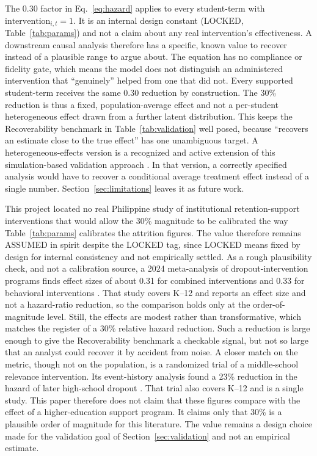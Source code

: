 \documentclass[11pt]{article}
\begin{document}
The $0.30$ factor in Eq.~\ref{eq:hazard} applies to every student-term with $\text{intervention}_{i,t}=1$. It is an internal design constant (LOCKED, Table~\ref{tab:params}) and not a claim about any real intervention's effectiveness. A downstream causal analysis therefore has a specific, known value to recover instead of a plausible range to argue about. The equation has no compliance or fidelity gate, which means the model does not distinguish an administered intervention that ``genuinely'' helped from one that did not. Every supported student-term receives the same $0.30$ reduction by construction. The 30\% reduction is thus a fixed, population-average effect and not a per-student heterogeneous effect drawn from a further latent distribution. This keeps the Recoverability benchmark in Table~\ref{tab:validation} well posed, because ``recovers an estimate close to the true effect'' has one unambiguous target. A heterogeneous-effects version is a recognized and active extension of this simulation-based validation approach \citep{smith2020global}. In that version, a correctly specified analysis would have to recover a conditional average treatment effect instead of a single number. Section~\ref{sec:limitations} leaves it as future work.

This project located no real Philippine study of institutional retention-support interventions that would allow the 30\% magnitude to be calibrated the way Table~\ref{tab:params} calibrates the attrition figures. The value therefore remains ASSUMED in spirit despite the LOCKED tag, since LOCKED means fixed by design for internal consistency and not empirically settled. As a rough plausibility check, and not a calibration source, a 2024 meta-analysis of dropout-intervention programs finds effect sizes of about 0.31 for combined interventions and 0.33 for behavioral interventions \citep{wang2024meta}. That study covers K--12 and reports an effect size and not a hazard-ratio reduction, so the comparison holds only at the order-of-magnitude level. Still, the effects are modest rather than transformative, which matches the register of a 30\% relative hazard reduction. Such a reduction is large enough to give the Recoverability benchmark a checkable signal, but not so large that an analyst could recover it by accident from noise. A closer match on the metric, though not on the population, is a randomized trial of a middle-school relevance intervention. Its event-history analysis found a 23\% reduction in the hazard of later high-school dropout \citep{rose2021careerstart}. That trial also covers K--12 and is a single study. This paper therefore does not claim that these figures compare with the effect of a higher-education support program. It claims only that 30\% is a plausible order of magnitude for this literature. The value remains a design choice made for the validation goal of Section~\ref{sec:validation} and not an empirical estimate.
\end{document}
